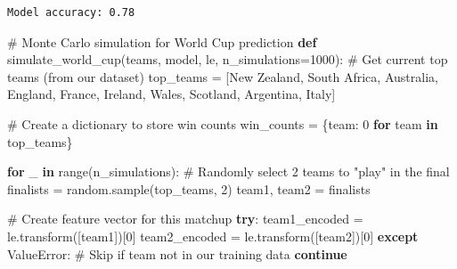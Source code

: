 \documentclass[
  letterpaper,
  DIV=11,
  numbers=noendperiod]{scrartcl}
\newenvironment{Shaded}{\begin{snugshade}}{\end{snugshade}}
\newcommand{\BuiltInTok}[1]{\textcolor[rgb]{0.00,0.23,0.31}{#1}}
\newcommand{\CommentTok}[1]{\textcolor[rgb]{0.37,0.37,0.37}{#1}}
\newcommand{\ControlFlowTok}[1]{\textcolor[rgb]{0.00,0.23,0.31}{\textbf{#1}}}
\newcommand{\DecValTok}[1]{\textcolor[rgb]{0.68,0.00,0.00}{#1}}
\newcommand{\KeywordTok}[1]{\textcolor[rgb]{0.00,0.23,0.31}{\textbf{#1}}}
\newcommand{\NormalTok}[1]{\textcolor[rgb]{0.00,0.23,0.31}{#1}}
\newcommand{\OperatorTok}[1]{\textcolor[rgb]{0.37,0.37,0.37}{#1}}
\newcommand{\PreprocessorTok}[1]{\textcolor[rgb]{0.68,0.00,0.00}{#1}}
\newcommand{\StringTok}[1]{\textcolor[rgb]{0.13,0.47,0.30}{#1}}
\begin{document}
\begin{verbatim}
Model accuracy: 0.78
\end{verbatim}

\begin{Shaded}
\begin{Highlighting}[]
\CommentTok{\# Monte Carlo simulation for World Cup prediction}
\KeywordTok{def}\NormalTok{ simulate\_world\_cup(teams, model, le, n\_simulations}\OperatorTok{=}\DecValTok{1000}\NormalTok{):}
    \CommentTok{\# Get current top teams (from our dataset)}
\NormalTok{    top\_teams }\OperatorTok{=}\NormalTok{ [}\StringTok{\textquotesingle{}New Zealand\textquotesingle{}}\NormalTok{, }\StringTok{\textquotesingle{}South Africa\textquotesingle{}}\NormalTok{, }\StringTok{\textquotesingle{}Australia\textquotesingle{}}\NormalTok{, }\StringTok{\textquotesingle{}England\textquotesingle{}}\NormalTok{, }\StringTok{\textquotesingle{}France\textquotesingle{}}\NormalTok{, }
                 \StringTok{\textquotesingle{}Ireland\textquotesingle{}}\NormalTok{, }\StringTok{\textquotesingle{}Wales\textquotesingle{}}\NormalTok{, }\StringTok{\textquotesingle{}Scotland\textquotesingle{}}\NormalTok{, }\StringTok{\textquotesingle{}Argentina\textquotesingle{}}\NormalTok{, }\StringTok{\textquotesingle{}Italy\textquotesingle{}}\NormalTok{]}
    
    \CommentTok{\# Create a dictionary to store win counts}
\NormalTok{    win\_counts }\OperatorTok{=}\NormalTok{ \{team: }\DecValTok{0} \ControlFlowTok{for}\NormalTok{ team }\KeywordTok{in}\NormalTok{ top\_teams\}}
    
    \ControlFlowTok{for}\NormalTok{ \_ }\KeywordTok{in} \BuiltInTok{range}\NormalTok{(n\_simulations):}
        \CommentTok{\# Randomly select 2 teams to "play" in the final}
\NormalTok{        finalists }\OperatorTok{=}\NormalTok{ random.sample(top\_teams, }\DecValTok{2}\NormalTok{)}
\NormalTok{        team1, team2 }\OperatorTok{=}\NormalTok{ finalists}
        
        \CommentTok{\# Create feature vector for this matchup}
        \ControlFlowTok{try}\NormalTok{:}
\NormalTok{            team1\_encoded }\OperatorTok{=}\NormalTok{ le.transform([team1])[}\DecValTok{0}\NormalTok{]}
\NormalTok{            team2\_encoded }\OperatorTok{=}\NormalTok{ le.transform([team2])[}\DecValTok{0}\NormalTok{]}
        \ControlFlowTok{except} \PreprocessorTok{ValueError}\NormalTok{:}
            \CommentTok{\# Skip if team not in our training data}
            \ControlFlowTok{continue}
            

\end{Highlighting}
\end{Shaded}
\end{document}
